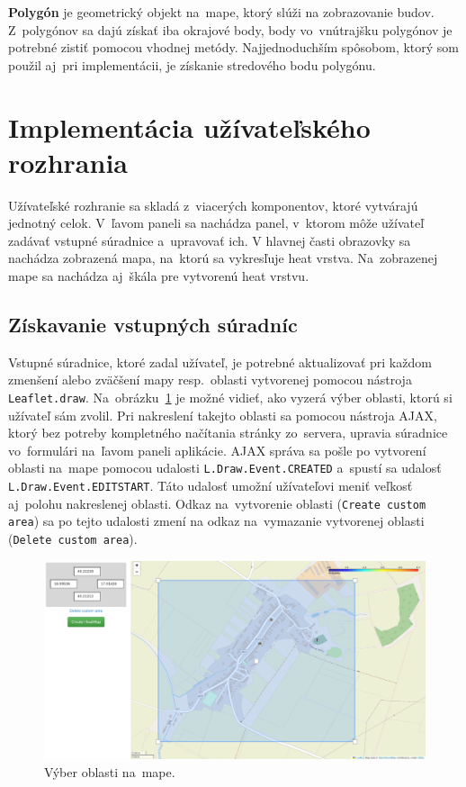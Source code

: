 \textbf{Polygón} je geometrický objekt na~mape, ktorý slúži na zobrazovanie budov. Z~polygónov sa dajú získať iba okrajové body, body vo~vnútrajšku polygónov je potrebné zistiť pomocou vhodnej metódy. Najjednoduchším spôsobom, ktorý som použil aj~pri implementácii, je získanie stredového bodu polygónu.


\section{Implementácia užívateľského rozhrania}
Užívateľské rozhranie sa skladá z~viacerých komponentov, ktoré vytvárajú jednotný celok. V~ľavom paneli sa nachádza panel, v~ktorom môže užívateľ zadávať vstupné súradnice a~upravovať ich. V hlavnej časti obrazovky sa nachádza zobrazená mapa, na~ktorú sa vykresľuje heat vrstva. Na~zobrazenej mape sa nachádza aj~škála pre vytvorenú heat vrstvu. 

\subsection*{Získavanie vstupných súradníc}
Vstupné súradnice, ktoré zadal užívateľ, je potrebné aktualizovať pri každom zmenšení alebo zväčšení mapy resp.~oblasti vytvorenej pomocou nástroja \texttt{Leaflet.draw}. Na~obrázku~\ref{fig:ui-screen} je možné vidieť, ako vyzerá výber oblasti, ktorú si užívateľ sám zvolil. Pri nakreslení takejto oblasti sa pomocou nástroja AJAX, ktorý bez potreby kompletného načítania stránky zo~servera, upravia súradnice vo~formulári na~ľavom paneli aplikácie. AJAX správa sa pošle po vytvorení oblasti na~mape pomocou udalosti \texttt{L.Draw.Event.CREATED} a~spustí sa udalosť \texttt{L.Draw.Event.EDITSTART}. Táto udalosť umožní užívateľovi meniť veľkosť aj~polohu nakreslenej oblasti. Odkaz na~vytvorenie oblasti (\texttt{Create custom area}) sa po tejto udalosti zmení na odkaz na~vymazanie vytvorenej oblasti (\texttt{Delete custom area}).

\begin{figure}[ht]
    \centering
    \includegraphics[width=0.98\linewidth]{obrazky-figures/ui-screen.png}
    \caption{Výber oblasti na~mape.}
    \label{fig:ui-screen}
\end{figure}

